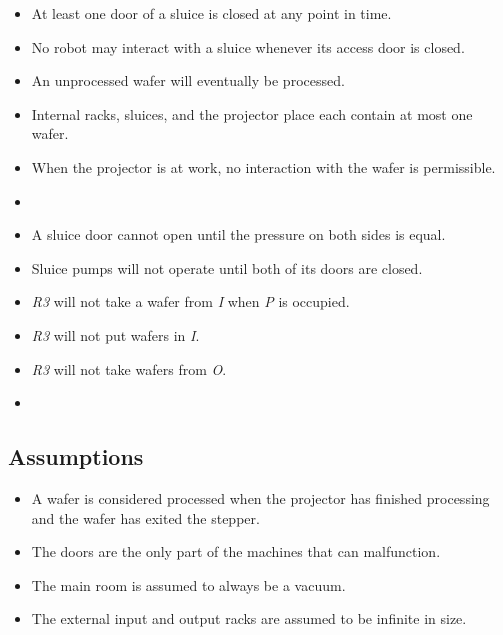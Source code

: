 
\begin{itemize}
  \item At least one door of a sluice is closed at any point in time.
  \item No robot may interact with a sluice whenever its access door is closed.
  \item An unprocessed wafer will eventually be processed.
  \item Internal racks, sluices, and the projector place each contain at most one wafer.
  \item When the projector is at work, no interaction with the wafer is permissible.
  \item {}
  \item A sluice door cannot open until the pressure on both sides is equal.
  \item Sluice pumps will not operate until both of its doors are closed.
  \item \emph{R3} will not take a wafer from \emph{I} when \emph{P} is occupied.
  \item \emph{R3} will not put wafers in \emph{I}.
  \item \emph{R3} will not take wafers from \emph{O}.
  \item {}
\end{itemize}

\subsection{Assumptions}
\begin{itemize}
  \item A wafer is considered processed when the projector has finished processing and the wafer has exited the stepper.
  \item The doors are the only part of the machines that can malfunction.
  \item The main room is assumed to always be a vacuum.
  \item The external input and output racks are assumed to be infinite in size.
\end{itemize}